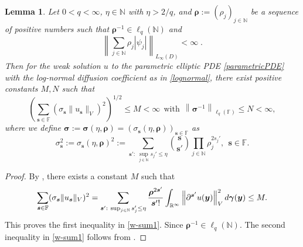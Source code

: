 \documentclass[11pt]{article}
\newtheorem{lemma}{Lemma}[section]
\numberwithin{equation}{section}
\theoremstyle{definition}
\theoremstyle{remark}
\newcommand{\norm}[2]{\left\|{#1}\right\|_{#2}}
\newcommand{\bs}{{\boldsymbol{s}}}
\newcommand{\by}{{\boldsymbol{y}}}
\newcommand{\bgamma}{{\boldsymbol{\gamma}}}
\newcommand{\brho}{{\boldsymbol{\rho}}}
\newcommand{\bsigma}{{\boldsymbol{\sigma}}}
\newcommand{\rd}{{\rm d}}
\def\NN{{\mathbb N}}
\def\NN{{\mathbb N}}
\def\FF{{\mathcal F}}
\def\RRi{{\mathbb R}^\infty}
\def\FF{{\mathcal F}}
\def\NN{{\mathbb N}}
\def\FF{{\mathbb F}}
\begin{document}
 	\begin{lemma}\label{lemma:weighted summablity,lognormal} 
 		Let $0 < q <\infty$, $\eta \in \NN$ with $\eta > 2/q$, and	
 		$\brho:=(\rho_j) _{j \in \NN}$ be a sequence of positive 
 		numbers such that $\brho^{-1} \in \ell_q(\NN)$ and
 		\begin{equation} \label{assumption1}
 			\left\| \sum _{j \in \NN} \rho_j |\psi_j| \right\|_{L_\infty(D)} 
 			<\infty\;.
 		\end{equation} 
 		{Then for the weak solution $u$ to the parametric elliptic PDE \eqref{parametricPDE} with the log-normal  diffusion coefficient as in \eqref{lognormal},} there exist positive constants $M,N$ such that 
 		\begin{equation} \label{w-sum1}
 			\left(\sum_{\bs\in\FF} (\sigma_\bs \| u_\bs\|_{V})^2\right)^{1/2} \le M < \infty\ \ \text{with} \ \
 			\norm{\bsigma^{-1}}{{\ell_q(\FF)}} \le N < \infty,
 		\end{equation}
 		where
 		we define $\bsigma:=\bsigma(\eta,\brho)=(\sigma_\bs(\eta,\brho))_{\bs \in \FF}$ as
 		\begin{equation} \label{sigma_s}
            \sigma_{\bs}^2:= \sigma_{\bs}(\eta,\brho)^2:=\sum_{\bs': \ \sup_{j\in\NN} s_j' \leq \eta}{\bs\choose \bs'} \prod_{j \in \NN}\rho_j^{2s_j'}, \ \ \bs \in \FF.
 		\end{equation}	 		
 	\end{lemma} 
{
 	\begin{proof}
 		By \cite[Theorems 3.3 and 4.2]{BCDM17}, there exists a constant $M$   such that 
 		\begin{equation} 
 			\sum_{\bs\in\FF} (\sigma_\bs \| u_\bs\|_{V})^2
 			=
            \sum_{\bs': \ \sup_{j\in\NN} s_j'\leq \eta} \frac{\brho^{2\bs'}}{\bs'!} 
 				\int_{\RRi}\norm{\partial^{\bs'} u(\by)}{V}^2 \rd \bgamma(\by)
 				\le M.
 		\end{equation}
 This proves the first inequality in \eqref{w-sum1}. Since $\brho^{-1}\in \ell_q(\NN)$.
        The second inequality in \eqref{w-sum1} follows from \cite[Lemma 5.1]{BCDM17}.
 		\hfill
 	\end{proof}
 }
\end{document}
